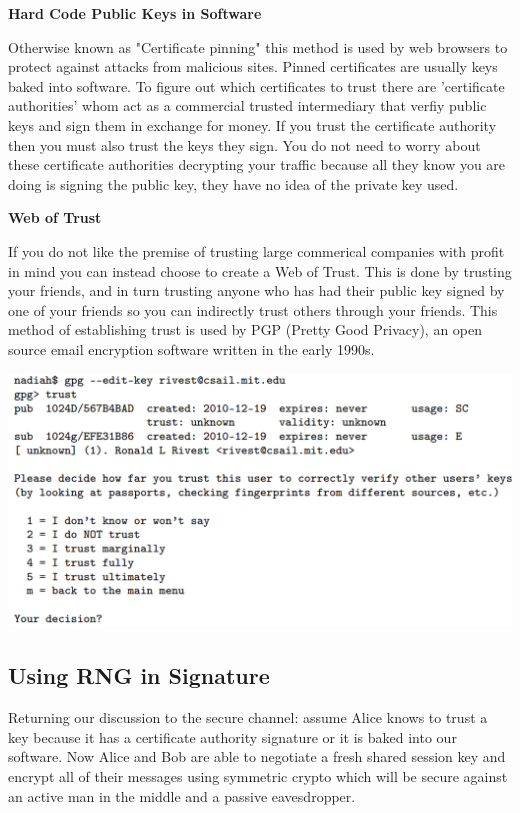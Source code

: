 \documentclass[11pt]{article} %
\begin{document}
\bigskip
{\parindent0pt \textbf{Hard Code Public Keys in Software}}

\smallskip
{\parindent0pt Otherwise known as "Certificate pinning" this method is used by
web browsers to protect against attacks from malicious sites.  Pinned
certificates are usually keys baked into software.  To figure out which
certificates to trust there are 'certificate authorities' whom act as a
commercial trusted intermediary that verfiy public keys and sign them in
exchange for money.  If you trust the certificate authority then you must also
trust the keys they sign.  You do not need to worry about these certificate
authorities decrypting your traffic because all they know you are doing is
signing the public key, they have no idea of the private key used.}

\bigskip
{\parindent0pt \textbf{Web of Trust}}

\smallskip
{\parindent0pt If you do not like the premise of trusting large commerical companies with
profit in mind you can instead choose to create a Web of Trust. This is done  by
trusting your friends, and in turn trusting anyone who has had their public key
signed by one of your friends so you can indirectly trust others through your
friends.  This method of establishing trust is used by PGP (Pretty Good
Privacy), an open source email encryption software written in the
early 1990s.}

\bigskip

\begin{center}
	\includegraphics[scale=0.55]{./Trust-in-keys2.png}
\end{center}
  
  
\subsection{Using RNG in Signature}

Returning our discussion to the secure channel: assume Alice knows to trust a 
key because it has a certificate authority signature or it is baked into our 
software. Now Alice and Bob are able to negotiate a fresh shared session key and
encrypt all of their messages using symmetric crypto which will be secure 
against an active man in the middle and a passive eavesdropper.
\end{document}

